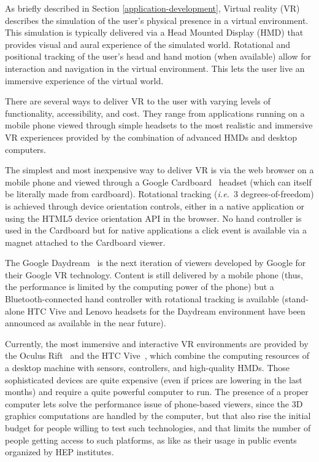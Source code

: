 \documentclass[12pt,a4paper]{article}
\begin{document}
As briefly described in Section \ref{application-development}, Virtual reality (VR) describes the simulation of the user’s physical presence in a virtual environment. This simulation
is typically delivered via a Head Mounted Display (HMD) that provides visual and aural experience of the simulated world. Rotational and positional tracking of the user’s head and hand motion (when available) allow for interaction and navigation in the virtual environment. 
This lets the user live an immersive experience of the virtual world.

There are several ways to deliver VR to the user with varying levels of functionality, accessibility, and cost.
They range from applications running on a mobile phone viewed through simple headsets to the most realistic and
immersive VR experiences provided by the combination of advanced HMDs and desktop computers.

The simplest and most inexpensive way to deliver VR is via the web browser on a mobile phone and viewed through a Google Cardboard~\cite{GoogleCardboard} headset (which can itself be literally made from cardboard). Rotational tracking ({\it i.e.}\ 3 degrees-of-freedom) is achieved through device orientation
controls, either in a native application or using the HTML5 device orientation API in the browser. No hand controller is used in the Cardboard but for native applications a click event
is available via a magnet attached to the Cardboard viewer.

The Google Daydream~\cite{GoogleDaydream} is the next iteration of viewers developed by Google for their Google VR technology. Content is still delivered by a mobile phone (thus, the performance is limited by the computing power of the phone) but a
Bluetooth-connected hand controller with rotational tracking is available (stand-alone HTC Vive and Lenovo headsets for the Daydream environment have been announced as available in the near future).

Currently, the most immersive and interactive VR environments are provided by the Oculus Rift~\cite{OculusRift} and the HTC Vive~\cite{HTCVive},
which combine the computing resources of a desktop machine with sensors, controllers, and high-quality HMDs. Those sophisticated devices are quite expensive (even if prices are lowering in the last months) and require a quite powerful computer to run. The presence of a proper computer lets solve the performance issue of phone-based viewers, since the 3D graphics computations are handled by the computer, but that also rise the initial budget for people willing to test such technologies, and that limits the number of people getting access to such platforms, as like as their usage in public events organized by HEP institutes.
\end{document}

